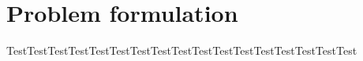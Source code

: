 \newpage
\section{Problem formulation}


TestTestTestTestTestTestTestTestTestTestTestTestTestTestTestTestTest